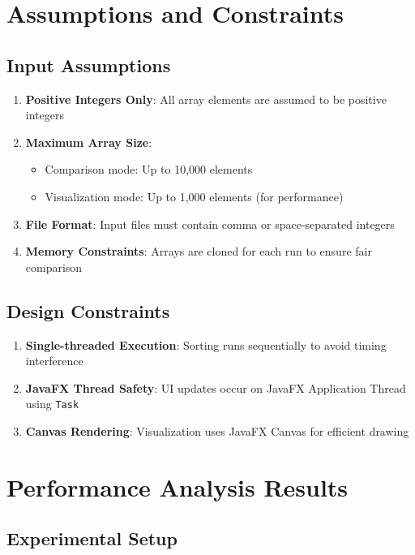 \documentclass[12pt,a4paper]{article}
\begin{document}
\section{Assumptions and Constraints}

\subsection{Input Assumptions}

\begin{enumerate}
    \item \textbf{Positive Integers Only}: All array elements are assumed to be positive integers
    \item \textbf{Maximum Array Size}: 
    \begin{itemize}
        \item Comparison mode: Up to 10,000 elements
        \item Visualization mode: Up to 1,000 elements (for performance)
    \end{itemize}
    \item \textbf{File Format}: Input files must contain comma or space-separated integers
    \item \textbf{Memory Constraints}: Arrays are cloned for each run to ensure fair comparison
\end{enumerate}

\subsection{Design Constraints}

\begin{enumerate}
    \item \textbf{Single-threaded Execution}: Sorting runs sequentially to avoid timing interference
    \item \textbf{JavaFX Thread Safety}: UI updates occur on JavaFX Application Thread using \texttt{Task}
    \item \textbf{Canvas Rendering}: Visualization uses JavaFX Canvas for efficient drawing
\end{enumerate}

\section{Performance Analysis Results}

\subsection{Experimental Setup}
\end{document}
